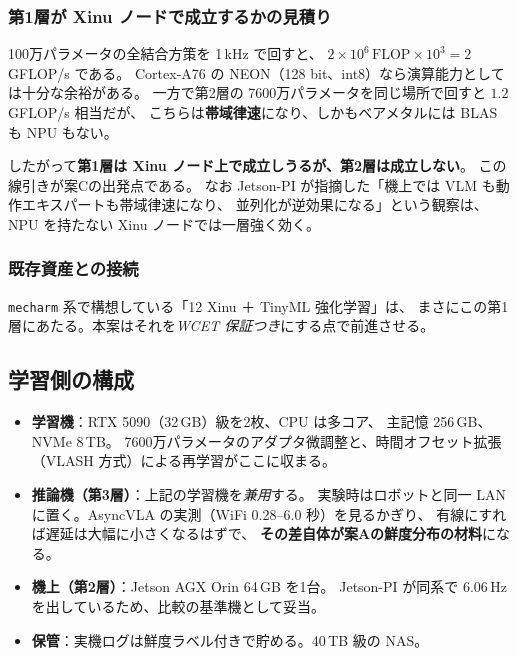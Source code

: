 \documentclass[11pt,a4paper]{article}
\newcommand{\code}[1]{\texttt{#1}}
\newcommand{\prob}[1]{\textbf{\textcolor{red!55!black}{#1}}}
\newcommand{\keyp}[1]{\textbf{\textcolor{blue!45!black}{#1}}}
\begin{document}
\subsubsection*{第1層が Xinu ノードで成立するかの見積り}

100万パラメータの全結合方策を 1\,kHz で回すと、
$2\times10^6\,\text{FLOP}\times10^3 = 2$\,GFLOP/s である。
Cortex-A76 の NEON（128 bit、int8）なら演算能力としては十分な余裕がある。
一方で第2層の 7600万パラメータを同じ場所で回すと $1.2$\,GFLOP/s 相当だが、
こちらは\prob{帯域律速}になり、しかもベアメタルには BLAS も NPU もない。

したがって\keyp{第1層は Xinu ノード上で成立しうるが、第2層は成立しない}。
この線引きが案Cの出発点である。
なお Jetson-PI が指摘した「機上では VLM も動作エキスパートも帯域律速になり、
並列化が逆効果になる」という観察は、NPU を持たない Xinu ノードでは一層強く効く。

\subsubsection*{既存資産との接続}

\code{mecharm} 系で構想している「12 Xinu ＋ TinyML 強化学習」は、
まさにこの第1層にあたる。本案はそれを\emph{WCET 保証つき}にする点で前進させる。

\subsection{学習側の構成}

\begin{itemize}[leftmargin=1.4em,itemsep=3pt]
  \item \textbf{学習機}：RTX 5090（32\,GB）級を2枚、CPU は多コア、
        主記憶 256\,GB、NVMe 8\,TB。
        7600万パラメータのアダプタ微調整と、時間オフセット拡張
        （VLASH 方式）による再学習がここに収まる。
  \item \textbf{推論機（第3層）}：上記の学習機を\emph{兼用}する。
        実験時はロボットと同一 LAN に置く。AsyncVLA の実測（WiFi 0.28--6.0 秒）を見るかぎり、
        有線にすれば遅延は大幅に小さくなるはずで、
        \keyp{その差自体が案Aの鮮度分布の材料}になる。
  \item \textbf{機上（第2層）}：Jetson AGX Orin 64\,GB を1台。
        Jetson-PI が同系で 6.06\,Hz を出しているため、比較の基準機として妥当。
  \item \textbf{保管}：実機ログは鮮度ラベル付きで貯める。40\,TB 級の NAS。
\end{itemize}
\end{document}
